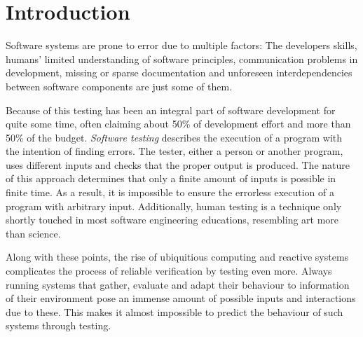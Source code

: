 \chapter{Introduction}
Software systems are prone to error due to multiple factors: The developers skills, humans' limited understanding of software principles, communication problems in development, missing or sparse documentation and unforeseen interdependencies between software components are just some of them.

Because of this testing has been an integral part of software development for quite some time, often claiming about 50\% of development effort and more than 50\% of the budget.
\emph{Software testing} describes the execution of a program with the intention of finding errors.
The tester, either a person or another program, uses different inputs and checks that the proper output is produced.
The nature of this approach determines that only a finite amount of inputs is possible in finite time.
As a result, it is impossible to ensure the errorless execution of a program with arbitrary input.
Additionally, human testing is a technique only shortly touched in most software engineering educations, resembling art more than science.\cite{Myers2011}

Along with these points, the rise of ubiquitious computing and reactive systems complicates the process of reliable verification by testing even more.
Always running systems that gather, evaluate and adapt their behaviour to information of their environment pose an immense amount of possible inputs and interactions due to these.
This makes it almost impossible to predict the behaviour of such systems through testing.

